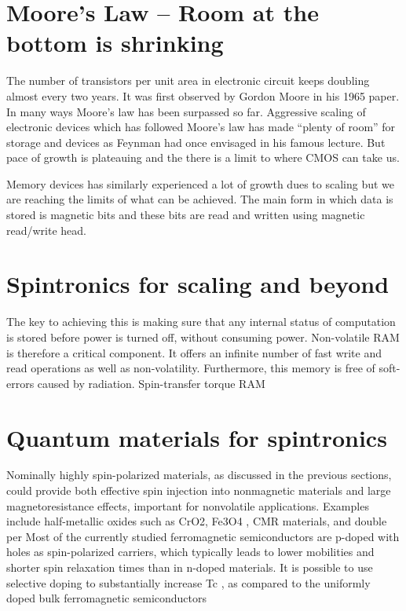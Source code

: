 \label{introduction}

\section{Moore’s Law – Room at the bottom is shrinking}
The number of transistors per unit area in electronic circuit keeps doubling almost every two years. 
It was first observed by Gordon Moore in his 1965 paper. In many ways Moore’s law has been surpassed 
so far. Aggressive scaling of electronic devices which has followed Moore’s law has made “plenty of room” 
for storage and devices as Feynman had once envisaged in his famous lecture. But pace of growth is plateauing 
and the there is a limit to where CMOS can take us. 

Memory devices has similarly experienced a lot of growth dues to scaling but we are reaching the limits of what
can be achieved. The main form in which data is stored is magnetic bits and these bits are read and written using
magnetic read/write head. 

\section{Spintronics for scaling and beyond}
The key to achieving this is making sure that any internal status of
computation is stored before power is turned off, without consuming
power. Non-volatile RAM is therefore a critical component. It
offers an infinite number of fast write and read operations as well
as non-volatility. Furthermore, this memory is free of soft-errors
caused by radiation. Spin-transfer torque RAM

\section{Quantum materials for spintronics}
Nominally highly spin-polarized materials, as discussed
in the previous sections, could provide both effective
spin injection into nonmagnetic materials and
large magnetoresistance effects, important for nonvolatile
applications. Examples include half-metallic oxides
such as CrO2, Fe3O4 , CMR materials, and double per
Most of the currently studied ferromagnetic semiconductors
are p-doped with holes as spin-polarized carriers,
which typically leads to lower mobilities and
shorter spin relaxation times than in n-doped materials.
It is possible to use selective doping to substantially increase
Tc , as compared to the uniformly doped bulk
ferromagnetic semiconductors

